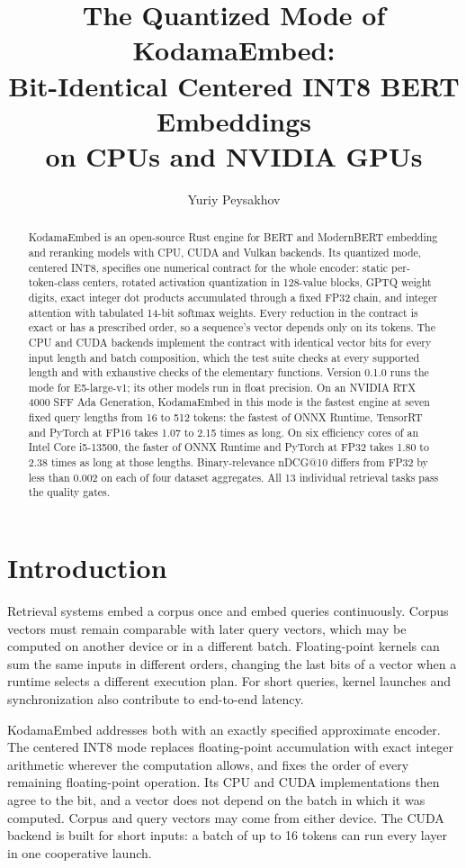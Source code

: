 \documentclass[10pt]{article}
\title{The Quantized Mode of KodamaEmbed:\\Bit-Identical Centered INT8 BERT Embeddings\\on CPUs and NVIDIA GPUs}
\author{Yuriy Peysakhov}
\date{}
\begin{document}
\maketitle

\begin{abstract}
KodamaEmbed is an open-source Rust engine for BERT and ModernBERT embedding
and reranking models with CPU, CUDA and Vulkan backends. Its quantized mode,
centered INT8, specifies one
numerical contract for the whole encoder: static per-token-class centers,
rotated activation quantization in 128-value blocks, GPTQ weight digits, exact
integer dot products accumulated through a fixed FP32 chain, and integer
attention with tabulated 14-bit softmax weights. Every reduction in the
contract is exact or has a prescribed order, so a sequence's vector depends
only on its tokens. The CPU and CUDA backends implement the contract with
identical vector bits for every input length and batch composition, which the
test suite checks at every supported length and with exhaustive checks of the
elementary functions. Version 0.1.0 runs the mode for E5-large-v1; its other
models run in float precision. On an
NVIDIA RTX 4000 SFF Ada Generation, KodamaEmbed in this mode is the fastest
engine at seven fixed query lengths from 16 to 512 tokens: the fastest of
ONNX Runtime,
TensorRT and PyTorch at FP16 takes 1.07 to 2.15 times as long. On six
efficiency cores of an Intel Core i5-13500, the faster of ONNX Runtime and
PyTorch at FP32 takes 1.80 to 2.38 times as long at those lengths.
Binary-relevance nDCG@10 differs
from FP32 by less than 0.002 on each of four dataset aggregates. All 13
individual retrieval tasks pass the quality gates.
\end{abstract}

\section{Introduction}

Retrieval systems embed a corpus once and embed queries continuously. Corpus
vectors must remain comparable with later query vectors, which may be computed
on another device or in a different batch. Floating-point kernels can sum the
same inputs in different orders, changing the last bits of a vector when a
runtime selects a different execution plan. For short queries, kernel launches
and synchronization also contribute to end-to-end latency.

KodamaEmbed addresses both with an exactly specified approximate encoder. The
centered INT8 mode replaces floating-point accumulation with exact integer
arithmetic wherever the computation allows, and fixes the order of every
remaining floating-point operation. Its CPU and CUDA implementations then
agree to the bit, and a vector does not depend on the batch in which it was
computed.
Corpus and query vectors may come from either device. The CUDA backend is
built for short inputs: a batch of up to 16 tokens can run every layer in one
cooperative launch.
\end{document}
